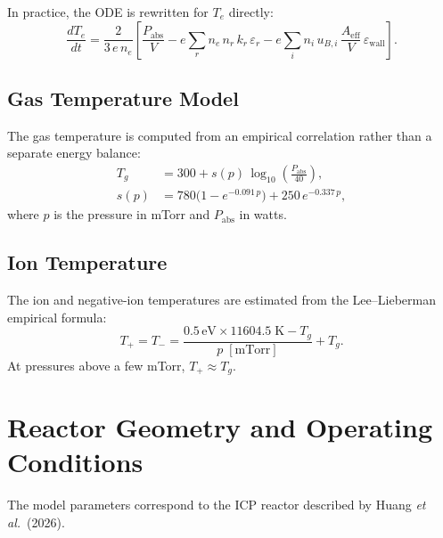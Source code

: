 \documentclass[11pt,a4paper]{article}
\newcommand{\dv}[2]{\frac{d #1}{d #2}}
\newcommand{\Te}{\ensuremath{T_e}}
\newcommand{\Tg}{\ensuremath{T_g}}
\renewcommand{\ne}{\ensuremath{n_e}}
\newcommand{\mev}{\,\mathrm{eV}}
\begin{document}
In practice, the ODE is rewritten for $\Te$ directly:
\begin{equation}
  \dv{\Te}{t} = \frac{2}{3\,e\,\ne}\left[
    \frac{P_{\text{abs}}}{V}
    - e\sum_r \ne\,n_r\,k_r\,\varepsilon_r
    - e\sum_i n_i\,u_{B,i}\,\frac{A_{\text{eff}}}{V}\,\varepsilon_{\text{wall}}
  \right].
\end{equation}


\subsection{Gas Temperature Model}
\label{sec:Tgas}

The gas temperature is computed from an empirical correlation rather than
a separate energy balance:
\begin{align}
  \Tg &= 300 + s(p)\,\log_{10}\!\left(\frac{P_{\text{abs}}}{40}\right), \label{eq:Tg}\\
  s(p) &= 780\bigl(1 - e^{-0.091\,p}\bigr) + 250\,e^{-0.337\,p}, \label{eq:sp}
\end{align}
where $p$ is the pressure in mTorr and $P_{\text{abs}}$ in watts.

\subsection{Ion Temperature}

The ion and negative-ion temperatures are estimated from the Lee--Lieberman
empirical formula:
\begin{equation}
  \label{eq:Tion}
  T_+ = T_- = \frac{0.5\mev \times 11604.5\;\text{K} - \Tg}{p\;[\text{mTorr}]} + \Tg.
\end{equation}
At pressures above a few mTorr, $T_+ \approx \Tg$.


\section{Reactor Geometry and Operating Conditions}
\label{sec:reactor}

The model parameters correspond to the ICP reactor described by Huang
\textit{et al.}\ (2026).
\end{document}
